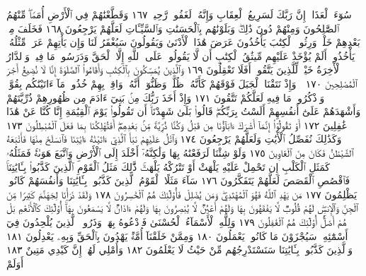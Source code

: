 سُوٓءَ ٱلْعَذَابِۗ إِنَّ رَبَّكَ لَسَرِيعُ ٱلْعِقَابِ وَإِنَّهُۥ لَغَفُورࣱ رَّحِيمࣱ ١٦٧
وَقَطَّعْنَٰهُمْ فِي ٱلْأَرْضِ أُمَمࣰاۖ مِّنْهُمُ ٱلصَّٰلِحُونَ وَمِنْهُمْ
دُونَ ذَٰلِكَۖ وَبَلَوْنَٰهُم بِٱلْحَسَنَٰتِ وَٱلسَّيِّـَٔاتِ لَعَلَّهُمْ
يَرْجِعُونَ ١٦٨ فَخَلَفَ مِنۢ بَعْدِهِمْ خَلْفࣱ وَرِثُوا۟ ٱلْكِتَٰبَ
يَأْخُذُونَ عَرَضَ هَٰذَا ٱلْأَدْنَىٰ وَيَقُولُونَ سَيُغْفَرُ لَنَا وَإِن
يَأْتِهِمْ عَرَضࣱ مِّثْلُهُۥ يَأْخُذُوهُۚ أَلَمْ يُؤْخَذْ عَلَيْهِم مِّيثَٰقُ ٱلْكِتَٰبِ
أَن لَّا يَقُولُوا۟ عَلَى ٱللَّهِ إِلَّا ٱلْحَقَّ وَدَرَسُوا۟ مَا فِيهِۗ وَٱلدَّارُ ٱلْأٓخِرَةُ
خَيْرࣱ لِّلَّذِينَ يَتَّقُونَۚ أَفَلَا تَعْقِلُونَ ١٦٩ وَٱلَّذِينَ يُمَسِّكُونَ
بِٱلْكِتَٰبِ وَأَقَامُوا۟ ٱلصَّلَوٰةَ إِنَّا لَا نُضِيعُ أَجْرَ ٱلْمُصْلِحِينَ ١٧٠
۞ وَإِذْ نَتَقْنَا ٱلْجَبَلَ فَوْقَهُمْ كَأَنَّهُۥ ظُلَّةࣱ وَظَنُّوٓا۟ أَنَّهُۥ وَاقِعُۢ بِهِمْ
خُذُوا۟ مَآ ءَاتَيْنَٰكُم بِقُوَّةࣲ وَٱذْكُرُوا۟ مَا فِيهِ لَعَلَّكُمْ تَتَّقُونَ ١٧١
وَإِذْ أَخَذَ رَبُّكَ مِنۢ بَنِيٓ ءَادَمَ مِن ظُهُورِهِمْ ذُرِّيَّتَهُمْ وَأَشْهَدَهُمْ
عَلَىٰٓ أَنفُسِهِمْ أَلَسْتُ بِرَبِّكُمْۖ قَالُوا۟ بَلَىٰ شَهِدْنَآۚ أَن تَقُولُوا۟ يَوْمَ
ٱلْقِيَٰمَةِ إِنَّا كُنَّا عَنْ هَٰذَا غَٰفِلِينَ ١٧٢ أَوْ تَقُولُوٓا۟ إِنَّمَآ أَشْرَكَ
ءَابَآؤُنَا مِن قَبْلُ وَكُنَّا ذُرِّيَّةࣰ مِّنۢ بَعْدِهِمْۖ أَفَتُهْلِكُنَا
بِمَا فَعَلَ ٱلْمُبْطِلُونَ ١٧٣ وَكَذَٰلِكَ نُفَصِّلُ ٱلْأٓيَٰتِ وَلَعَلَّهُمْ
يَرْجِعُونَ ١٧٤ وَٱتْلُ عَلَيْهِمْ نَبَأَ ٱلَّذِيٓ ءَاتَيْنَٰهُ ءَايَٰتِنَا فَٱنسَلَخَ
مِنْهَا فَأَتْبَعَهُ ٱلشَّيْطَٰنُ فَكَانَ مِنَ ٱلْغَاوِينَ ١٧٥ وَلَوْ شِئْنَا
لَرَفَعْنَٰهُ بِهَا وَلَٰكِنَّهُۥٓ أَخْلَدَ إِلَى ٱلْأَرْضِ وَٱتَّبَعَ هَوَىٰهُۚ فَمَثَلُهُۥ
كَمَثَلِ ٱلْكَلْبِ إِن تَحْمِلْ عَلَيْهِ يَلْهَثْ أَوْ تَتْرُكْهُ
يَلْهَثۚ ذَّٰلِكَ مَثَلُ ٱلْقَوْمِ ٱلَّذِينَ كَذَّبُوا۟ بِـَٔايَٰتِنَاۚ فَٱقْصُصِ
ٱلْقَصَصَ لَعَلَّهُمْ يَتَفَكَّرُونَ ١٧٦ سَآءَ مَثَلًا ٱلْقَوْمُ ٱلَّذِينَ
كَذَّبُوا۟ بِـَٔايَٰتِنَا وَأَنفُسَهُمْ كَانُوا۟ يَظْلِمُونَ ١٧٧ مَن يَهْدِ ٱللَّهُ
فَهُوَ ٱلْمُهْتَدِيۖ وَمَن يُضْلِلْ فَأُو۟لَٰٓئِكَ هُمُ ٱلْخَٰسِرُونَ ١٧٨
وَلَقَدْ ذَرَأْنَا لِجَهَنَّمَ كَثِيرࣰا مِّنَ ٱلْجِنِّ وَٱلْإِنسِۖ لَهُمْ قُلُوبࣱ لَّا يَفْقَهُونَ
بِهَا وَلَهُمْ أَعْيُنࣱ لَّا يُبْصِرُونَ بِهَا وَلَهُمْ ءَاذَانࣱ لَّا يَسْمَعُونَ بِهَآۚ
أُو۟لَٰٓئِكَ كَٱلْأَنْعَٰمِ بَلْ هُمْ أَضَلُّۚ أُو۟لَٰٓئِكَ هُمُ ٱلْغَٰفِلُونَ ١٧٩ وَلِلَّهِ
ٱلْأَسْمَآءُ ٱلْحُسْنَىٰ فَٱدْعُوهُ بِهَاۖ وَذَرُوا۟ ٱلَّذِينَ يُلْحِدُونَ فِيٓ أَسْمَٰٓئِهِۦۚ
سَيُجْزَوْنَ مَا كَانُوا۟ يَعْمَلُونَ ١٨٠ وَمِمَّنْ خَلَقْنَآ أُمَّةࣱ يَهْدُونَ بِٱلْحَقِّ
وَبِهِۦ يَعْدِلُونَ ١٨١ وَٱلَّذِينَ كَذَّبُوا۟ بِـَٔايَٰتِنَا سَنَسْتَدْرِجُهُم
مِّنْ حَيْثُ لَا يَعْلَمُونَ ١٨٢ وَأُمْلِي لَهُمْۚ إِنَّ كَيْدِي مَتِينٌ ١٨٣ أَوَلَمْ
